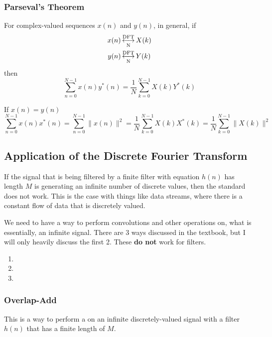 \subsubsection{Parseval's Theorem}\label{subsubsec:DFT_Properties-Parsevals_Theorem}
For complex-valued sequences $x(n)$ and $y(n)$, in general, if
\begin{align*}
  x(n) &\operatorname{\overset{\text{DFT}}{\underset{N}{\longleftrightarrow}}} X(k) \\
  y(n) &\operatorname{\overset{\text{DFT}}{\underset{N}{\longleftrightarrow}}} Y(k)
\end{align*}
then
\begin{equation}\label{eq:DFT_Properties-Parsevals_Theorem}
  \sum\limits_{n=0}^{N-1}x(n)y^{*}(n) = \frac{1}{N} \sum\limits_{k=0}^{N-1} X(k)Y^{*}(k)
\end{equation}

If $x(n) = y(n)$
\begin{equation}\label{eq:DFT_Properties-Parsevals_Theorem-Magnitude}
  \sum\limits_{n=0}^{N-1}x(n) x^{*}(n) = \sum\limits_{n=0}^{N-1} \lVert x(n) \rVert^{2} = \frac{1}{N} \sum\limits_{k=0}^{N-1} X(k)X^{*}(k) = \frac{1}{N} \sum\limits_{k=0}^{N-1} \lVert X(k) \rVert^{2}
\end{equation}

\subsection{Application of the Discrete Fourier Transform}\label{subsec:DFT_Application}
If the signal that is being filtered by a finite filter with equation $h(n)$ has length $M$ is generating an infinite number of discrete values, then the standard  does not work.
This is the case with things like data streams, where there is a constant flow of data that is discretely valued.

We need to have a way to perform convolutions and other operations on, what is essentially, an infinite signal.
There are 3 ways discussed in the textbook, but I will only heavily discuss the first 2.
These \textbf{do not} work for  filters.
\begin{enumerate}[noitemsep]
\item {}
\item {}
\item {}
\end{enumerate}

\subsubsection{Overlap-Add}\label{subsubsec:DFT_Application-Overlap_Add}
This is a way to perform a  on an infinite discretely-valued signal with a filter $h(n)$ that has a finite length of $M$.

